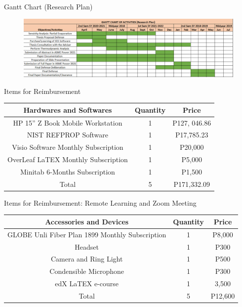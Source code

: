 \begin{frame}{Gantt Chart (Research Plan)}
    \begin{figure}
        \centering
        \includegraphics[height=0.25\textwidth]{images/ganttchart2.png}
    \end{figure}
\end{frame}

\begin{frame}{Items for Reimbursement}
    \begin{table}[]
        \centering
        \begin{tabular}{ccc}
        \hline
            Hardwares and Softwares & Quantity &  Price\\
        \hline
            HP 15” Z Book Mobile Workstation & 1 & P127, 046.86 \\
            NIST REFPROP Software & 1 & P17,785.23 \\
            Visio Software Monthly Subscription & 1 & P20,000 \\
            OverLeaf LaTEX Monthly Subscription & 1 & P5,000 \\
            Minitab 6-Months Subscription & 1 & P1,500 \\
        \hline
           Total & 5 & P171,332.09 \\
        \hline
        \end{tabular}
    \end{table}
\end{frame}

\begin{frame}{Items for Reimbursement: Remote Learning and Zoom Meeting}
    \begin{table}[h]
        \centering
        \begin{tabular}{ccc}
        \hline
            Accessories and Devices  & Quantity &  Price\\
        \hline
            GLOBE Unli Fiber Plan 1899 Monthly Subscription & 1 & P8,000 \\
            Headset & 1 & P300 \\
            Camera and Ring Light & 1 & P500 \\
            Condensible Microphone & 1 & P300 \\
            edX LaTEX e-course & 1 & 3,500 \\
        \hline
            Total & 5 & P12,600 \\
        \hline
        \end{tabular}
    \end{table}
\end{frame}

